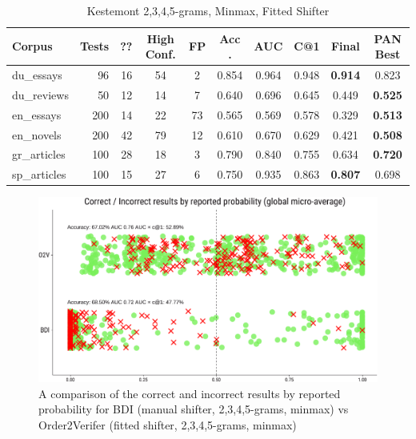 \documentclass[
    hf
]{ceurart}
\begin{document}
\begin{table}
    \caption{Kestemont 2,3,4,5-grams, Minmax, Fitted Shifter}
    \label{tab:o2v}
    \raggedright
    \begin{tabular}{lrrccccccc}
        \toprule
        Corpus       & Tests & ?? & High Conf. & FP & Acc  . & AUC   & C@1   & Final          & PAN Best       \\
        \midrule
        du\_essays   & 96    & 16 & 54         & 2  & 0.854  & 0.964 & 0.948 & \textbf{0.914} & 0.823          \\
        du\_reviews  & 50    & 12 & 14         & 7  & 0.640  & 0.696 & 0.645 & 0.449          & \textbf{0.525} \\
        en\_essays   & 200   & 14 & 22         & 73 & 0.565  & 0.569 & 0.578 & 0.329          & \textbf{0.513} \\
        en\_novels   & 200   & 42 & 79         & 12 & 0.610  & 0.670 & 0.629 & 0.421          & \textbf{0.508} \\
        gr\_articles & 100   & 28 & 18         & 3  & 0.790  & 0.840 & 0.755 & 0.634          & \textbf{0.720} \\
        sp\_articles & 100   & 15 & 27         & 6  & 0.750  & 0.935 & 0.863 & \textbf{0.807} & 0.698          \\
        \bottomrule
    \end{tabular}
\end{table}

\begin{figure}
    \includegraphics[width=\linewidth]{figures/bdi_o2v-crop.pdf}
    \caption{A comparison of the correct and incorrect results by reported
        probability for BDI (manual shifter, 2,3,4,5-grams, minmax) vs
        Order2Verifer (fitted shifter, 2,3,4,5-grams, minmax)}
    \label{fig:bdi_o2v}
\end{figure}
\end{document}
